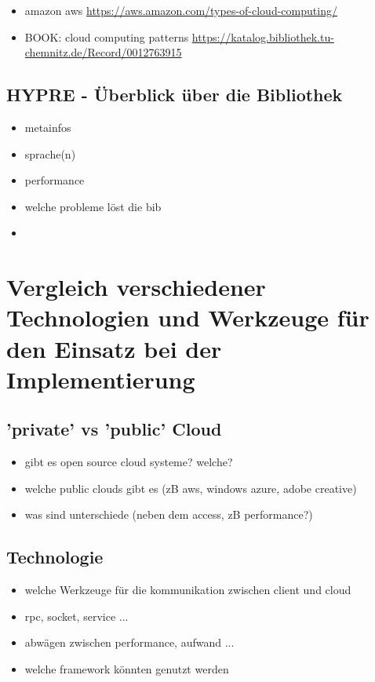 \documentclass[a4paper,10pt]{article}
\begin{document}
\begin{itemize}
 \item amazon aws \url{https://aws.amazon.com/types-of-cloud-computing/}
 \item BOOK: cloud computing patterns \url{https://katalog.bibliothek.tu-chemnitz.de/Record/0012763915}
\end{itemize}

\subsection{HYPRE - Überblick über die Bibliothek}

\begin{itemize}
 \item metainfos
 \item sprache(n)
 \item performance
 \item welche probleme löst die bib
 \item 
\end{itemize}

\newpage

\section{Vergleich verschiedener Technologien und Werkzeuge für den Einsatz bei der Implementierung}

\subsection{'private' vs 'public' Cloud}

\begin{itemize}
 \item gibt es open source cloud systeme? welche?
 \item welche public clouds gibt es (zB aws, windows azure, adobe creative)
 \item was sind unterschiede (neben dem access, zB performance?)
\end{itemize}

\subsection{Technologie}

\begin{itemize}
 \item welche Werkzeuge für die kommunikation zwischen client und cloud
 \item rpc, socket, service ...
 \item abwägen zwischen performance, aufwand ...
 \item welche framework könnten genutzt werden
\end{itemize}
\end{document}
